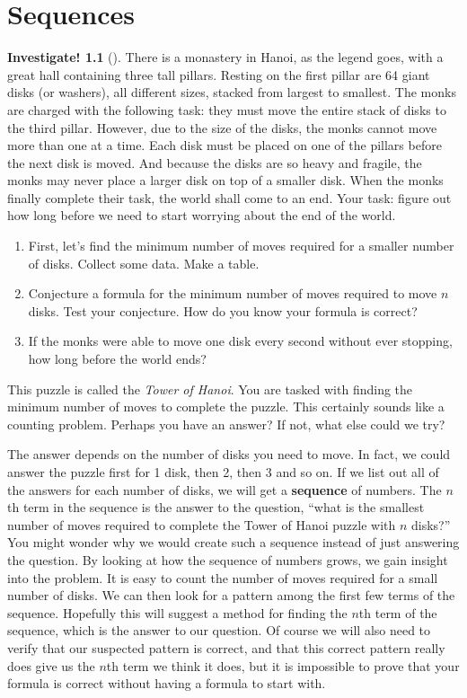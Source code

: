 \documentclass[12pt,]{book}
\newcommand{\terminology}[1]{\textbf{#1}}
\theoremstyle{plain}
\theoremstyle{definition}
\theoremstyle{definition}
\theoremstyle{definition}
\newtheorem{investigation}[project]{Investigate!}
\numberwithin{equation}{chapter}
\begin{document}
\chapter[{Sequences}]{Sequences}\label{ch_sequences}
\begin{investigation}[]\label{investigation-1}
\hypertarget{p-15}{}%
There is a monastery in Hanoi, as the legend goes, with a great hall containing three tall pillars. Resting on the first pillar are 64 giant disks (or washers), all different sizes, stacked from largest to smallest. The monks are charged with the following task: they must move the entire stack of disks to the third pillar. However, due to the size of the disks, the monks cannot move more than one at a time. Each disk must be placed on one of the pillars before the next disk is moved. And because the disks are so heavy and fragile, the monks may never place a larger disk on top of a smaller disk. When the monks finally complete their task, the world shall come to an end. Your task: figure out how long before we need to start worrying about the end of the world. %
\begin{enumerate}
\item\hypertarget{li-1}{}\hypertarget{p-16}{}%
First, let's find the minimum number of moves required for a smaller number of disks. Collect some data. Make a table.%
\item\hypertarget{li-2}{}\hypertarget{p-17}{}%
Conjecture a formula for the minimum number of moves required to move \(n\) disks. Test your conjecture. How do you know your formula is correct?%
\item\hypertarget{li-3}{}\hypertarget{p-18}{}%
If the monks were able to move one disk every second without ever stopping, how long before the world ends?%
\end{enumerate}
%
\end{investigation}
\hypertarget{p-19}{}%
This puzzle is called the \emph{Tower of Hanoi}. You are tasked with finding the minimum number of moves to complete the puzzle. This certainly sounds like a counting problem. Perhaps you have an answer? If not, what else could we try?%
\par
\hypertarget{p-20}{}%
The answer depends on the number of disks you need to move. In fact, we could answer the puzzle first for 1 disk, then 2, then 3 and so on. If we list out all of the answers for each number of disks, we will get a \terminology{sequence} of numbers. The \(n\)th term in the sequence is the answer to the question, ``what is the smallest number of moves required to complete the Tower of Hanoi puzzle with \(n\) disks?'' You might wonder why we would create such a sequence instead of just answering the question. By looking at how the sequence of numbers grows, we gain insight into the problem. It is easy to count the number of moves required for a small number of disks. We can then look for a pattern among the first few terms of the sequence. Hopefully this will suggest a method for finding the \(n\)th term of the sequence, which is the answer to our question. Of course we will also need to verify that our suspected pattern is correct, and that this correct pattern really does give us the \(n\)th term we think it does, but it is impossible to prove that your formula is correct without having a formula to start with.%
\end{document}
